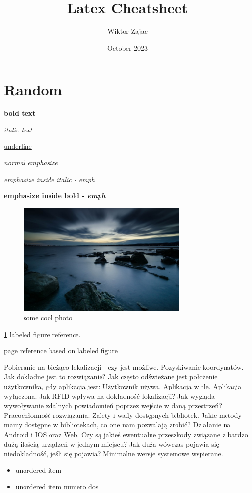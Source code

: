 \documentclass[12pt, a4paper]{article} %
\title{Latex Cheatsheet}
\author{Wiktor Zajac}
\date{October 2023}
\begin{document}
\maketitle
\vspace{5mm}

\section{Random}

\textbf{bold text}

\textit{italic text}

\underline{underline}

\emph{normal emphasize}

\textit{emphasize inside italic - \emph{emph}}

\textbf{emphasize inside bold - \emph{emph}}


\begin{figure}[h]
	\centering
	\includegraphics[width=0.75\textwidth]{image}
	\caption{some cool photo}
	\label{fig:image}
\end{figure}


\ref{fig:image} labeled figure reference.

\pageref{fig:image} page reference based on labeled figure

Pobieranie na bieżąco lokalizacji - czy jest możliwe. Pozyskiwanie koordynatów. 
Jak dokładne jest to rozwiązanie?
Jak często odświeżane jest położenie użytkownika, gdy aplikacja jest:
Użytkownik używa.
Aplikacja w tle.
Aplikacja wyłączona. 
Jak RFID wpływa na dokładność lokalizacji?
Jak wygląda wywoływanie zdalnych powiadomień poprzez wejście w daną przestrzeń?
Pracochłonność rozwiązania. 
Zalety i wady dostępnych bibliotek. 
Jakie metody mamy dostępne w bibliotekach, co one nam pozwalają zrobić?
Działanie na Android i IOS oraz Web.
Czy są jakieś ewentualne przeszkody związane z bardzo dużą ilością urządzeń w jednym miejscu? Jak duża wówczas pojawia się niedokładność, jeśli się pojawia?
Minimalne wersje systemowe wspierane. 
\begin{itemize}
	\item unordered item
	\item unordered item numero dos
\end{itemize}
\end{document}
